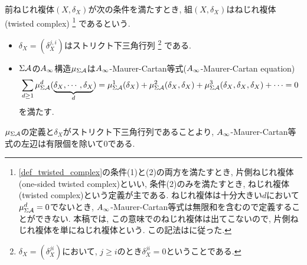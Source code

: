 \documentclass[uplatex, a4paper, 14Q, dvipdfmx]{jsarticle}
\begin{document}
\begin{definition}[ねじれ複体] \label{def_twisted_complex}
  前ねじれ複体$(X,\delta_X)$が次の条件を満たすとき, 組$(X,\delta_X)$はねじれ複体(twisted complex)
  \footnote{
    \cref{def_twisted_complex}の条件(1)と(2)の両方を満たすとき, 片側ねじれ複体(one-sided twisted complex)といい, 条件(2)のみを満たすとき, ねじれ複体(twisted complex)という定義が主である. 
    ねじれ複体は十分大きい$d$において$\mu^d_{\Sigma\mathcal{A}} = 0$でないとき, $A_{\infty}$-Maurer-Cartan等式は無限和を含むので定義することができない. 
    本稿では, この意味でのねじれ複体は出てこないので, 片側ねじれ複体を単にねじれ複体という.
    この記法は\cite{Sei}に従った. 
  }
  であるという. 
  \begin{itemize}
    \item $\delta_X = (\delta_X^{j,i})$はストリクト下三角行列
    \footnote{
      $\delta_X = (\delta_X^{ji})$において, $j \geq i$のとき$\delta_X^{ji} = 0$ということである.
    }
    である. 
    \item $\Sigma\mathcal{A}$の$A_{\infty}$構造$\mu_{\Sigma\mathcal{A}}$は$A_{\infty}$-Maurer-Cartan等式($A_{\infty}$-Maurer-Cartan equation)
    \begin{align*}
      \sum_{d \geq 1} \mu^d_{\Sigma\mathcal{A}} (\underbrace{\delta_X,\cdots,\delta_X}_{d})
      = \mu^1_{\Sigma\mathcal{A}}(\delta_X) + \mu^2_{\Sigma\mathcal{A}}(\delta_X,\delta_X) + \mu^3_{\Sigma\mathcal{A}}(\delta_X,\delta_X,\delta_X) + \cdots = 0
    \end{align*}
    を満たす. 
  \end{itemize}
\end{definition}

\begin{remark}
  $\mu_{\Sigma\mathcal{A}}$の定義と$\delta_X$がストリクト下三角行列であることより, $A_{\infty}$-Maurer-Cartan等式の左辺は有限個を除いて$0$である.
\end{remark}
\end{document}
